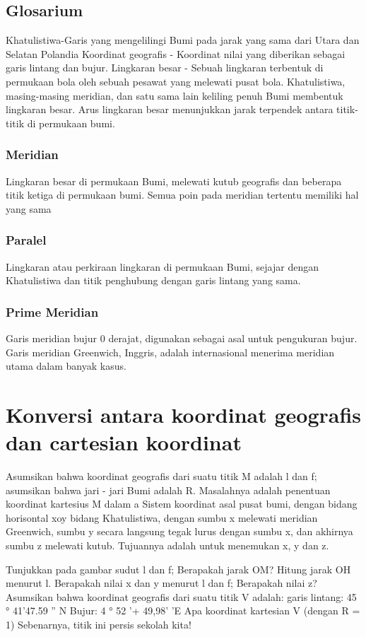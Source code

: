 \subsection{Glosarium}
	Khatulistiwa-Garis yang mengelilingi Bumi pada jarak yang sama dari Utara dan Selatan
	Polandia Koordinat geografis - Koordinat nilai yang diberikan sebagai garis lintang dan bujur.
	Lingkaran besar - Sebuah lingkaran terbentuk di permukaan bola oleh sebuah pesawat yang melewati
	pusat bola. Khatulistiwa, masing-masing meridian, dan satu sama lain keliling penuh
	Bumi membentuk lingkaran besar. Arus lingkaran besar menunjukkan jarak terpendek antara titik-titik di permukaan bumi.

	\subsubsection{Meridian}
	Lingkaran besar di permukaan Bumi, melewati kutub geografis
	dan beberapa titik ketiga di permukaan bumi. Semua poin pada meridian tertentu memiliki hal yang sama
	\subsubsection{Paralel}
	Lingkaran atau perkiraan lingkaran di permukaan Bumi, sejajar dengan
	Khatulistiwa dan titik penghubung dengan garis lintang yang sama.
	\subsubsection{Prime Meridian}
	Garis meridian bujur 0 derajat, digunakan sebagai asal untuk
	pengukuran bujur. Garis meridian Greenwich, Inggris, adalah internasional
	menerima meridian utama dalam banyak kasus.

\section{Konversi antara koordinat geografis dan cartesian koordinat}
	Asumsikan bahwa koordinat geografis dari suatu titik M adalah l dan f; asumsikan bahwa jari - jari
	Bumi adalah R. Masalahnya adalah penentuan koordinat kartesius M dalam a
	Sistem koordinat asal pusat bumi, dengan bidang horisontal xoy bidang
	Khatulistiwa, dengan sumbu x melewati meridian Greenwich, sumbu y secara langsung
	tegak lurus dengan sumbu x, dan akhirnya sumbu z melewati kutub.
	Tujuannya adalah untuk menemukan x, y dan z.

	Tunjukkan pada gambar sudut l dan f;
	Berapakah jarak OM?
	Hitung jarak OH menurut l.
	Berapakah nilai x dan y menurut l dan f;
	Berapakah nilai z?
	Asumsikan bahwa koordinat geografis dari suatu titik V
	adalah:
	garis lintang: 45 ° 41'47.59 '' N
	Bujur: 4 ° 52 '+ 49,98' 'E
	Apa koordinat kartesian V (dengan R = 1)
	Sebenarnya, titik ini persis sekolah kita!

